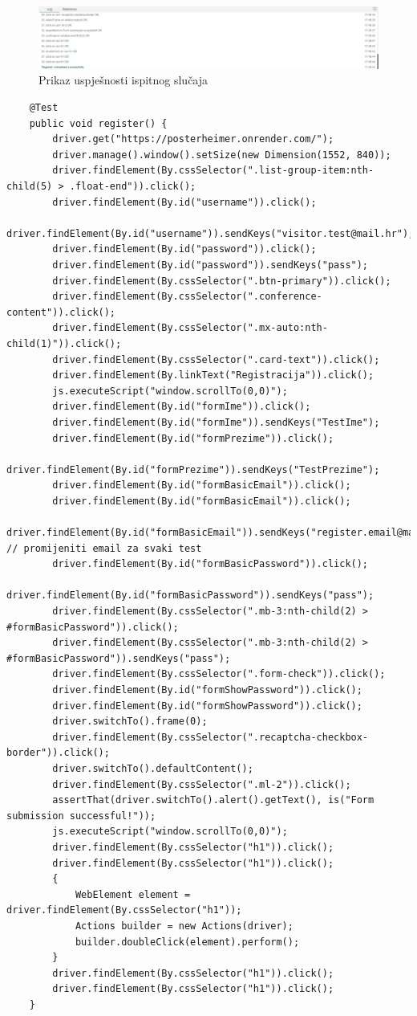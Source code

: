 \begin{figure} [hbt!]
	\includegraphics[width=\linewidth]{Slike/Register}
	\caption{Prikaz uspješnosti ispitnog slučaja}
\end{figure}

\begin{lstlisting}
	@Test
	public void register() {
		driver.get("https://posterheimer.onrender.com/");
		driver.manage().window().setSize(new Dimension(1552, 840));
		driver.findElement(By.cssSelector(".list-group-item:nth-child(5) > .float-end")).click();
		driver.findElement(By.id("username")).click();
		driver.findElement(By.id("username")).sendKeys("visitor.test@mail.hr");
		driver.findElement(By.id("password")).click();
		driver.findElement(By.id("password")).sendKeys("pass");
		driver.findElement(By.cssSelector(".btn-primary")).click();
		driver.findElement(By.cssSelector(".conference-content")).click();
		driver.findElement(By.cssSelector(".mx-auto:nth-child(1)")).click();
		driver.findElement(By.cssSelector(".card-text")).click();
		driver.findElement(By.linkText("Registracija")).click();
		js.executeScript("window.scrollTo(0,0)");
		driver.findElement(By.id("formIme")).click();
		driver.findElement(By.id("formIme")).sendKeys("TestIme");
		driver.findElement(By.id("formPrezime")).click();
		driver.findElement(By.id("formPrezime")).sendKeys("TestPrezime");
		driver.findElement(By.id("formBasicEmail")).click();
		driver.findElement(By.id("formBasicEmail")).click();
		driver.findElement(By.id("formBasicEmail")).sendKeys("register.email@mail.hr"); // promijeniti email za svaki test
		driver.findElement(By.id("formBasicPassword")).click();
		driver.findElement(By.id("formBasicPassword")).sendKeys("pass");
		driver.findElement(By.cssSelector(".mb-3:nth-child(2) > #formBasicPassword")).click();
		driver.findElement(By.cssSelector(".mb-3:nth-child(2) > #formBasicPassword")).sendKeys("pass");
		driver.findElement(By.cssSelector(".form-check")).click();
		driver.findElement(By.id("formShowPassword")).click();
		driver.findElement(By.id("formShowPassword")).click();
		driver.switchTo().frame(0);
		driver.findElement(By.cssSelector(".recaptcha-checkbox-border")).click();
		driver.switchTo().defaultContent();
		driver.findElement(By.cssSelector(".ml-2")).click();
		assertThat(driver.switchTo().alert().getText(), is("Form submission successful!"));
		js.executeScript("window.scrollTo(0,0)");
		driver.findElement(By.cssSelector("h1")).click();
		driver.findElement(By.cssSelector("h1")).click();
		{
			WebElement element = driver.findElement(By.cssSelector("h1"));
			Actions builder = new Actions(driver);
			builder.doubleClick(element).perform();
		}
		driver.findElement(By.cssSelector("h1")).click();
		driver.findElement(By.cssSelector("h1")).click();
	}
\end{lstlisting}

